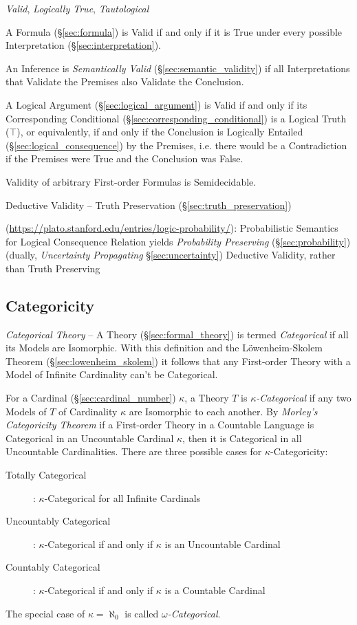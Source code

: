\emph{Valid}, \emph{Logically True}, \emph{Tautological}

A Formula (\S\ref{sec:formula}) is Valid if and only if it is True under every
possible Interpretation (\S\ref{sec:interpretation}).

An Inference is \emph{Semantically Valid} (\S\ref{sec:semantic_validity}) if all
Interpretations that Validate the Premises also Validate the Conclusion.

A Logical Argument (\S\ref{sec:logical_argument}) is Valid if and only if its
Corresponding Conditional (\S\ref{sec:corresponding_conditional}) is a Logical
Truth ($\top$), or equivalently, if and only if the Conclusion is Logically
Entailed (\S\ref{sec:logical_consequence}) by the Premises, i.e. there would be
a Contradiction if the Premises were True and the Conclusion was False.

Validity of arbitrary First-order Formulas is Semidecidable.

Deductive Validity -- Truth Preservation (\S\ref{sec:truth_preservation})

(\url{https://plato.stanford.edu/entries/logic-probability/}): Probabilistic
Semantics for Logical Consequence Relation yields \emph{Probability Preserving}
(\S\ref{sec:probability}) (dually, \emph{Uncertainty Propagating}
\S\ref{sec:uncertainty}) Deductive Validity, rather than Truth Preserving



\subsection{Categoricity}\label{sec:categoricity}

\emph{Categorical Theory} -- A Theory (\S\ref{sec:formal_theory}) is termed
\emph{Categorical} if all its Models are Isomorphic. With this definition and
the L\"owenheim-Skolem Theorem (\S\ref{sec:lowenheim_skolem}) it follows that
any First-order Theory with a Model of Infinite Cardinality can't be
Categorical.

For a Cardinal (\S\ref{sec:cardinal_number}) $\kappa$, a Theory $T$ is
\emph{$\kappa$-Categorical} if any two Models of $T$ of Cardinality
$\kappa$ are Isomorphic to each another. By \emph{Morley's
  Categoricity Theorem}\cite{morley65} if a First-order Theory in a
Countable Language is Categorical in an Uncountable Cardinal $\kappa$,
then it is Categorical in all Uncountable Cardinalities. There are
three possible cases for $\kappa$-Categoricity:
\begin{description}
\item[Totally Categorical]: $\kappa$-Categorical for all Infinite
  Cardinals
\item[Uncountably Categorical]: $\kappa$-Categorical if and only if
  $\kappa$ is an Uncountable Cardinal
\item[Countably Categorical]: $\kappa$-Categorical if and only if
  $\kappa$ is a Countable Cardinal
\end{description}
The special case of $\kappa = \aleph_0$ is called
\emph{$\omega$-Categorical}.

